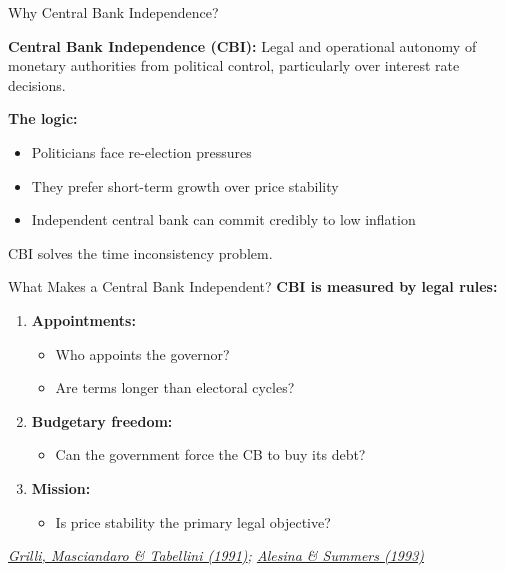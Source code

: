 \documentclass[10pt]{beamer}
\begin{document}
\begin{frame}{Why Central Bank Independence?}
\begin{tcolorbox}[colback=myTeal!5, colframe=myTeal, title=Definition]
\textbf{Central Bank Independence (CBI):} Legal and operational autonomy of monetary authorities from political control, particularly over interest rate decisions.
\end{tcolorbox}

\vspace{0.3cm}
\textbf{The logic:}
\begin{itemize}
\item Politicians face re-election pressures
\item They prefer short-term growth over price stability
\item Independent central bank can commit credibly to low inflation
\end{itemize}

\vspace{0.3cm}
\alert{CBI solves the time inconsistency problem.}
\end{frame}

\begin{frame}{What Makes a Central Bank Independent?}
\textbf{CBI is measured by legal rules:}

\begin{enumerate}
\item \textbf{Appointments:}
\begin{itemize}
\item Who appoints the governor?
\item Are terms longer than electoral cycles?
\end{itemize}

\item \textbf{Budgetary freedom:}
\begin{itemize}
\item Can the government force the CB to buy its debt?
\end{itemize}

\item \textbf{Mission:}
\begin{itemize}
\item Is price stability the primary legal objective?
\end{itemize}
\end{enumerate}

\textit{\href{https://academic.oup.com/economicpolicy/article-abstract/6/13/341/2392405}{Grilli, Masciandaro \& Tabellini (1991)}; \href{https://www.jstor.org/stable/2077833?seq=1}{Alesina \& Summers (1993)}}
\end{frame}
\end{document}

